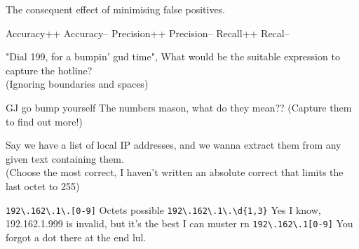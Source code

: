 \documentclass[theme=sleek, randomorder, hidesidemenu]{webquiz}
\begin{document}
\begin{question}

  The consequent effect of minimising false positives.

  \begin{choice}[columns=3]
    \correct Accuracy++
    \incorrect Accuracy--
    \correct Precision++
    \incorrect Precision--
    \incorrect Recall++
    \incorrect Recal--
  \end{choice}

\end{question}

\begin{question}

  "Dial 199, for a bumpin' gud time", What would be the suitable expression to capture the hotline?\\
  (Ignoring boundaries and spaces)

  \answer[string]{\verb|[0-9]|}
  \whenRight GJ go bump yourself
  \whenWrong The numbers mason, what do they mean?? (Capture them to find out more!)
\end{question}

\begin{question}

  Say we have a list of local IP addresses, and we wanna extract them from any given text containing them.\\
  (Choose the most correct, I haven't written an absolute correct that limits the last octet to 255)

  \begin{choice}[columns=2]
    \incorrect \verb|192\.162\.1\.[0-9]|  Octets possible
    \correct \verb|192\.162\.1\.\d{1,3}| \feedback Yes I know, 192.162.1.999 is invalid, but it's the best I can muster rn
    \incorrect \verb|192\.162\.1[0-9]| \feedback You forgot a dot there at the end lul.
  \end{choice}

\end{question}
\end{document}
